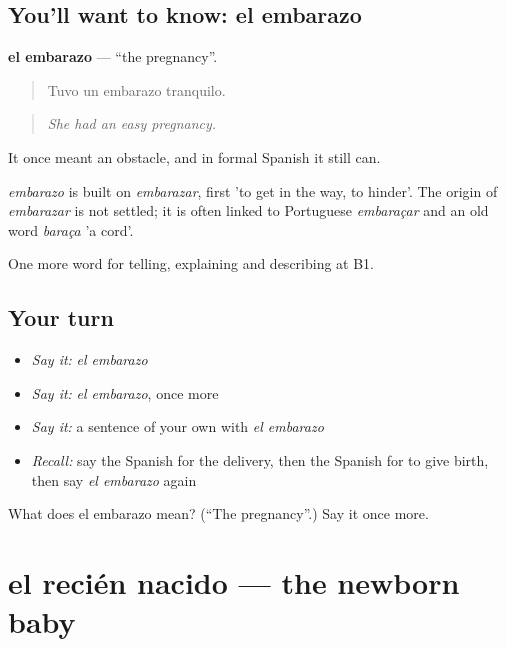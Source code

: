 \subsection*{You'll want to know: el embarazo}
\textbf{el embarazo} — \textquotedblleft{}the pregnancy\textquotedblright{}.

\begin{quote}
Tuvo un embarazo tranquilo.
\end{quote}

\begin{quote}
\emph{She had an easy pregnancy.}
\end{quote}

It once meant an obstacle, and in formal Spanish it still can.

\begin{cousinweb}
\emph{embarazo} is built on \emph{embarazar}, first 'to get in the way, to hinder'. The origin of \emph{embarazar} is not settled; it is often linked to Portuguese \emph{embaraçar} and an old word \emph{baraça} 'a cord'.
\end{cousinweb}

\begin{grammarlens}[title={What you've built}]
One more word for telling, explaining and describing at B1.
\end{grammarlens}

\subsection*{Your turn}
\begin{itemize}
\raggedright
  \item \emph{Say it:} \emph{el embarazo}
  \item \emph{Say it:} \emph{el embarazo}, once more
  \item \emph{Say it:} a sentence of your own with \emph{el embarazo}
  \item \emph{Recall:} say the Spanish for the delivery, then the Spanish for to give birth, then say \emph{el embarazo} again
\end{itemize}

\begin{tcolorbox}[breakable,colback=teal!4,colframe=teal!35!black,title={Before you move on}]
What does el embarazo mean? (\textquotedblleft{}The pregnancy\textquotedblright{}.) Say it once more.
\end{tcolorbox}
\section[el recién nacido]{el recién nacido — the newborn baby}

